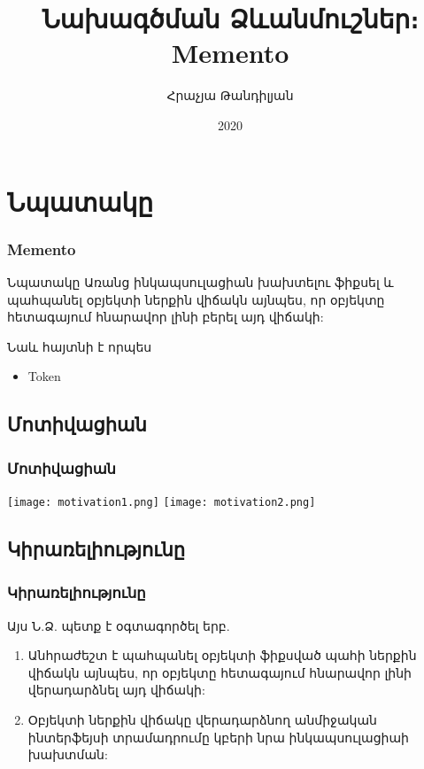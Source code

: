 \documentclass{beamer}
\begin{document}
\title[Memento]{Նախագծման Ձևանմուշներ։ Memento}
\author[Հրաչյա Թանդիլյան\copyright]{Հրաչյա Թանդիլյան}
\date{2020}

\begin{frame}
\titlepage
\end{frame}

\section{Նպատակը}
\begin{frame}\frametitle{Memento}
\begin{block}{Նպատակը}
    Առանց ինկապսուլացիան խախտելու ֆիքսել և պահպանել օբյեկտի ներքին վիճակն այնպես,
    որ օբյեկտը հետագայում հնարավոր լինի բերել այդ վիճակի:
\end{block}
\vfill
Նաև հայտնի է որպես
\begin{itemize}
    \item Token
\end{itemize}
\end{frame}

\subsection{Մոտիվացիան}
\begin{frame}\frametitle{Մոտիվացիան}
\begin{center}
    \texttt{[image: motivation1.png]}
    \vfill
    \texttt{[image: motivation2.png]}
\end{center}
\end{frame}

\subsection{Կիրառելիությունը}
\begin{frame}\frametitle{Կիրառելիությունը}
Այս Ն.Ձ. պետք է օգտագործել երբ.
\vfill
\begin{enumerate}
    \item Անհրաժեշտ է պահպանել օբյեկտի ֆիքսված պահի ներքին վիճակն այնպես,
    որ օբյեկտը հետագայում հնարավոր լինի վերադարձնել այդ վիճակի: \vfill
    \item Օբյեկտի ներքին վիճակը վերադարձնող անմիջական ինտերֆեյսի տրամադրումը
    կբերի նրա ինկապսուլացիաի խախտման:
\end{enumerate}
\end{frame}
\end{document}
